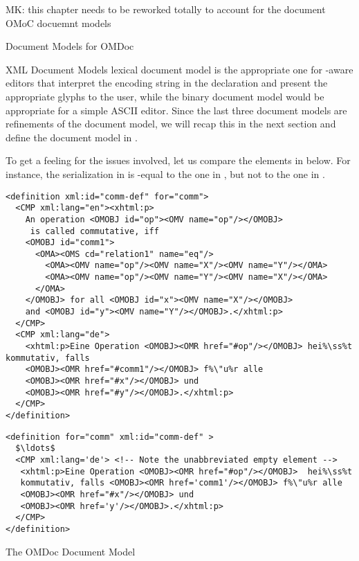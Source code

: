 \begin{oldpart}{MK: this chapter needs to be reworked totally to account for the document
    OMoC docuemnt models}
\begin{tchapter}[id=document-model]{Document Models for OMDoc}
\begin{tsection}[id=xml-DOM]{XML Document Models}
lexical document model is the appropriate one for {}-aware editors that
interpret the encoding string in the {\xml} declaration and present the appropriate glyphs
to the user, while the binary document model would be appropriate for a simple ASCII
editor. Since the last three document models are refinements of the {\xml} document model,
we will recap this in the next section and define the {\omdoc} document model in
{}.

To get a feeling for the issues involved, let us compare the {\omdoc} elements in
{} below. For instance, the serialization in {}
is {\xml}-equal to the one in {}, but not to the one in
{}.

\begin{lstlisting}[escapechar=\%,label=lst:first,
   index={definition,CMP,OMOBJ,OMA},caption={An {\omdoc} Definition}]
<definition xml:id="comm-def" for="comm">
  <CMP xml:lang="en"><xhtml:p>
    An operation <OMOBJ id="op"><OMV name="op"/></OMOBJ>
     is called commutative, iff 
    <OMOBJ id="comm1">
      <OMA><OMS cd="relation1" name="eq"/>
        <OMA><OMV name="op"/><OMV name="X"/><OMV name="Y"/></OMA>
        <OMA><OMV name="op"/><OMV name="Y"/><OMV name="X"/></OMA>
      </OMA>
    </OMOBJ> for all <OMOBJ id="x"><OMV name="X"/></OMOBJ> 
    and <OMOBJ id="y"><OMV name="Y"/></OMOBJ>.</xhtml:p>
  </CMP>
  <CMP xml:lang="de">
    <xhtml:p>Eine Operation <OMOBJ><OMR href="#op"/></OMOBJ> hei%\ss%t kommutativ, falls 
    <OMOBJ><OMR href="#comm1"/></OMOBJ> f%\"u%r alle 
    <OMOBJ><OMR href="#x"/></OMOBJ> und 
    <OMOBJ><OMR href="#y"/></OMOBJ>.</xhtml:p>
  </CMP>
</definition>
\end{lstlisting}

\begin{lstlisting}[escapechar=\%,label=lst:second,mathescape,
   index={definition,CMP,OMOBJ},
   caption={An {\xml}-equal serialization for {\mylstref{first}}}]
<definition for="comm" xml:id="comm-def" >
  $\ldots$
  <CMP xml:lang='de'> <!-- Note the unabbreviated empty element -->
   <xhtml:p>Eine Operation <OMOBJ><OMR href="#op"/></OMOBJ>  hei%\ss%t 
   kommutativ, falls <OMOBJ><OMR href='comm1'/></OMOBJ> f%\"u%r alle 
   <OMOBJ><OMR href="#x"/></OMOBJ> und 
   <OMOBJ><OMR href='y'/></OMOBJ>.</xhtml:p>
  </CMP>
</definition>
\end{lstlisting}
\end{tsection}

\begin{tsection}[id=omdom]{The OMDoc Document Model}


\end{tsection}
\end{tchapter}
\end{oldpart}
